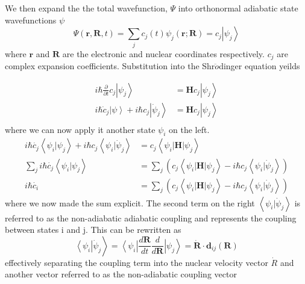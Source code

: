           We then expand the the total wavefunction, \(\Psi\) into orthonormal adiabatic state wavefunctions \(\psi\)
          \begin{equation}
            \Psi(\textbf{r}, \textbf{R}, t) = \sum_j c_j(t)\psi_j(\textbf{r}; \textbf{R}) = c_j \left| \psi_j \right>
          \end{equation}
          where \(\textbf{r}\) and \(\textbf{R}\) are the electronic and nuclear coordinates respectively.
          \(c_j\) are complex expansion coefficients.
          Substitution into the Shr\(\ddot{o}\)dinger equation yeilds

          \begin{align}
            i\hbar \frac{\partial}{\partial t} c_j \left | \psi _j \right> &= \mathbf{H} c_j \left | \psi_j \right>\\
            i\hbar \dot{c}_j \left | \psi \right> + i\hbar c_j \left| \dot{\psi}_j \right> &= \mathbf{H} c_j \left| \psi_j \right>\\
          \end{align}
          where we can now apply it another state \(\psi_i\) on the left.
          \begin{align} \label{eq:dcoefficient}
            i\hbar \dot{c_j} \left< \psi_i | \psi_j \right> + i\hbar c_j \left< \psi_i | \dot{\psi}_j \right> &= c_j \left< \psi_i | \mathbf{H} | \psi_j \right>\\
            \sum_j i\hbar \dot{c_j} \left< \psi_i | \psi_j \right> &= \sum_j \left(c_j \left< \psi_i | \mathbf{H} | \psi_j \right> - i\hbar c_j \left< \psi_i | \dot{\psi}_j \right> \right)\\
            i\hbar \dot{c_i} &= \sum_j \left(c_j \left< \psi_i | \mathbf{H} | \psi_j \right> - i\hbar c_j \left< \psi_i | \dot{\psi}_j \right> \right)
          \end{align}
          where we now made the sum explicit.
          The second term on the right \(\left< \psi_i | \dot{\psi}_j \right>\) is referred to as the non-adiabatic adiabatic coupling and represents the coupling between states i and j.
          This can be rewritten as 
          \begin{equation} \label{eq:tullyS3}
            \left<\psi_i\right|\dot{\psi}_j\left.\right>=\left<\psi_i\right|\frac{d\mathbf{R}}{dt}\frac{d}{d\mathbf{R}}\left|\psi_j\right>=\dot{\mathbf{R}}\cdot\mathbf{d}_{ij}(\mathbf{R})
          \end{equation}
          effectively separating the coupling term into the nuclear velocity vector \(\dot{R}\) and another vector referred to as the non-adiabatic coupling vector 
